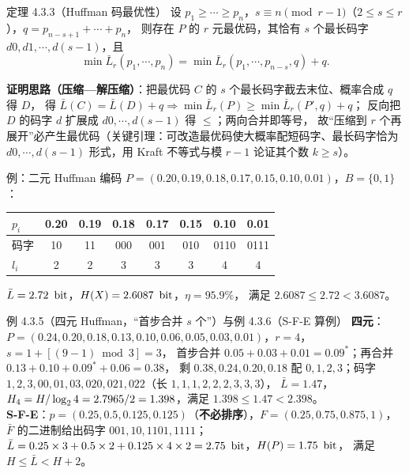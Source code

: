 \begin{thmbox}{定理 4.3.3（Huffman 码最优性）}
设 $p_1\ge\cdots\ge p_n$，$s\equiv n\pmod{r-1}$（$2\le s\le r$），$q=p_{n-s+1}+\cdots+p_n$，
则存在 $P$ 的 $r$ 元最优码，其恰有 $s$ 个最长码字 $d0,d1,\cdots,d(s-1)$，且
\begin{equation}
\min\bar L_r(p_1,\cdots,p_n)=\min\bar L_r\left(p_1,\cdots,p_{n-s},q\right)+q .
\tag{4.3.4}
\end{equation}
\end{thmbox}
\textbf{证明思路（压缩—解压缩）}：把最优码 $C$ 的 $s$ 个最长码字截去末位、概率合成 $q$ 得 $D$，
得 $\bar L(C)=\bar L(D)+q\Rightarrow\min\bar L_r(P)\ge\min\bar L_r(P',q)+q$；
反向把 $D$ 的码字 $d$ 扩展成 $d0,\cdots,d(s-1)$ 得 $\le$；两向合并即等号，
故“压缩到 $r$ 个再展开”必产生最优码（关键引理：可改造最优码使大概率配短码字、最长码字恰为
$d0,\cdots,d(s-1)$ 形式，用 Kraft 不等式与模 $r-1$ 论证其个数 $k\ge s$）。

\begin{example}{例：二元 Huffman 编码}
$P=(0.20,0.19,0.18,0.17,0.15,0.10,0.01)$，$B=\{0,1\}$：
\begin{center}
\begin{tabular}{@{}lccccccc@{}}
\toprule
$p_i$ & 0.20 & 0.19 & 0.18 & 0.17 & 0.15 & 0.10 & 0.01\\
\midrule
码字 & 10 & 11 & 000 & 001 & 010 & 0110 & 0111\\
$l_i$ & 2 & 2 & 3 & 3 & 3 & 4 & 4\\
\bottomrule
\end{tabular}
\end{center}
$\bar L=2.72\ \,\text{bit}$，$H(X)=2.6087\ \bit$，$\eta=95.9\%$，
满足 $2.6087\le2.72<3.6087$。
\end{example}

\begin{example}{例 4.3.5（四元 Huffman，“首步合并 $s$ 个”）与例 4.3.6（S-F-E 算例）}
\textbf{四元}：$P=(0.24,0.20,0.18,0.13,0.10,0.06,0.05,0.03,0.01)$，$r=4$，$s=1+[(9-1)\bmod3]=3$，
首步合并 $0.05+0.03+0.01=0.09^{*}$；再合并 $0.13+0.10+0.09^{*}+0.06=0.38$，
剩 $0.38,0.24,0.20,0.18$ 配 $0,1,2,3$；码字 $1,2,3,00,01,03,020,021,022$（长 $1,1,1,2,2,2,3,3,3$），
$\bar L=1.47$，$H_4=H/\log_{2}4=2.7965/2=1.398$，满足 $1.398\le1.47<2.398$。\\
\textbf{S-F-E}：$p=(0.25,0.5,0.125,0.125)$（\textbf{不必排序}），$F=(0.25,0.75,0.875,1)$，
$\bar F$ 的二进制给出码字 $001,10,1101,1111$；
$\bar L=0.25\times3+0.5\times2+0.125\times4\times2=2.75\ \,\text{bit}$，$H(P)=1.75\ \,\text{bit}$，
满足 $H\le\bar L<H+2$。
\end{example}

